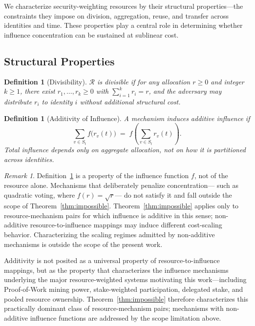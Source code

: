 \documentclass[manuscript,review]{acmart}
\newtheorem{definition}[theorem]{Definition}
\theoremstyle{remark}
\newtheorem{remark}{Remark}[section]
\begin{document}
	We characterize security-weighting resources by their
	structural properties---the constraints they impose on
	division, aggregation, reuse, and transfer across
	identities and time.
	These properties play a central role in determining
	whether influence concentration can be sustained at
	sublinear cost.
	
	\subsection{Structural Properties}
	\label{ssec:properties}
	
	\begin{definition}[Divisibility]
		\label{def:divisibility}
		$\mathcal{R}$ is \emph{divisible} if for any allocation
		$r \geq 0$ and integer $k \geq 1$, there exist
		$r_1, \ldots, r_k \geq 0$ with $\sum_{i=1}^{k} r_i = r$,
		and the adversary may distribute $r_i$ to identity $i$
		without additional structural cost.
	\end{definition}
	
	\begin{definition}[Additivity of Influence]
		\label{def:additivity}
		A mechanism \emph{induces additive influence} if
		\begin{equation}
			\sum_{v \in S_t} f\bigl(r_v(t)\bigr)
			\;=\;
			f\!\left(\sum_{v \in S_t} r_v(t)\right).
		\end{equation}
		Total influence depends only on aggregate allocation,
		not on how it is partitioned across identities.
	\end{definition}
	
	\begin{remark}
		Definition~\ref{def:additivity} is a property of
		the influence function $f$, not of the resource alone.
		Mechanisms that deliberately penalize concentration---
		such as quadratic voting, where $f(r) = \sqrt{r}$---
		do not satisfy it and fall outside the scope of
		Theorem~\ref{thm:impossible}.
		Theorem~\ref{thm:impossible} applies only to
		resource-mechanism pairs for which influence is
		additive in this sense; non-additive
		resource-to-influence mappings may induce different
		cost-scaling behavior.
		Characterizing the scaling regimes admitted by
		non-additive mechanisms is outside the scope of the
		present work.
	\end{remark}
	
	Additivity is not posited as a universal property of
	resource-to-influence mappings, but as the property
	that characterizes the influence mechanisms underlying
	the major resource-weighted systems motivating this
	work---including Proof-of-Work mining power,
	stake-weighted participation, delegated stake, and
	pooled resource ownership.
	Theorem~\ref{thm:impossible} therefore characterizes
	this practically dominant class of resource-mechanism
	pairs; mechanisms with non-additive influence functions
	are addressed by the scope limitation above.
	
\end{document}
